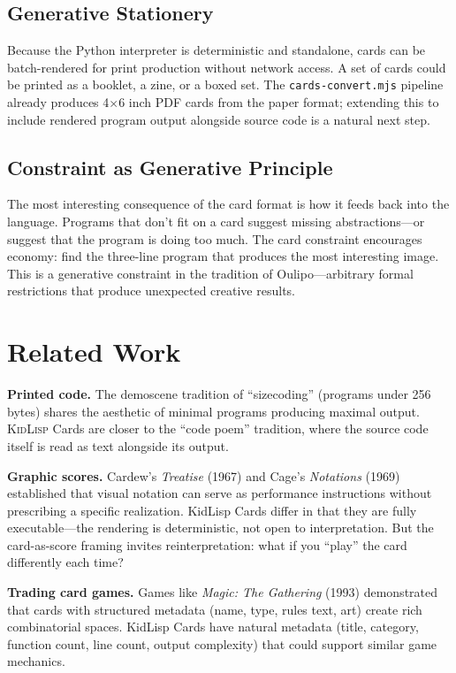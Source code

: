 \documentclass[10pt,letterpaper,twocolumn]{article}
\newcommand{\kidlisp}{\textsc{KidLisp}}
\begin{document}
\subsection{Generative Stationery}

Because the Python interpreter is deterministic and standalone, cards can be batch-rendered for print production without network access. A set of cards could be printed as a booklet, a zine, or a boxed set. The \texttt{cards-convert.mjs} pipeline already produces 4$\times$6 inch PDF cards from the paper format; extending this to include rendered program output alongside source code is a natural next step.

\subsection{Constraint as Generative Principle}

The most interesting consequence of the card format is how it feeds back into the language. Programs that don't fit on a card suggest missing abstractions---or suggest that the program is doing too much. The card constraint encourages economy: find the three-line program that produces the most interesting image. This is a generative constraint in the tradition of Oulipo---arbitrary formal restrictions that produce unexpected creative results.


\section{Related Work}

\textbf{Printed code.} The demoscene tradition of ``sizecoding'' (programs under 256 bytes) shares the aesthetic of minimal programs producing maximal output. \kidlisp{} Cards are closer to the ``code poem'' tradition, where the source code itself is read as text alongside its output.

\textbf{Graphic scores.} Cardew's \emph{Treatise} (1967) and Cage's \emph{Notations} (1969) established that visual notation can serve as performance instructions without prescribing a specific realization. KidLisp Cards differ in that they are fully executable---the rendering is deterministic, not open to interpretation. But the card-as-score framing invites reinterpretation: what if you ``play'' the card differently each time?

\textbf{Trading card games.} Games like \emph{Magic: The Gathering} (1993) demonstrated that cards with structured metadata (name, type, rules text, art) create rich combinatorial spaces. KidLisp Cards have natural metadata (title, category, function count, line count, output complexity) that could support similar game mechanics.
\end{document}
